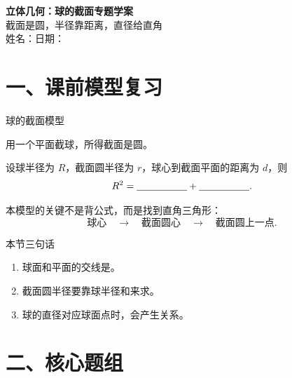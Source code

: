 \documentclass[11pt,a4paper]{ctexart}
\begin{document}
\begin{center}
  {\Large\bfseries 立体几何：球的截面专题学案}\\[0.3em]
  {\large 截面是圆，半径靠距离，直径给直角}\\[0.3em]
  姓名：\blank{2.8cm}\quad 日期：\blank{2.8cm}
\end{center}

\section*{一、课前模型复习}

\begin{taskbox}{球的截面模型}
\begin{minipage}[t]{0.62\textwidth}
用一个平面截球，所得截面是圆。

设球半径为 $R$，截面圆半径为 $r$，球心到截面平面的距离为 $d$，则
\[
  R^2=\blank{1.8cm}+\blank{1.8cm}.
\]

本模型的关键不是背公式，而是找到直角三角形：
\[
  \text{球心}\quad \longrightarrow \quad \text{截面圆心}\quad \longrightarrow \quad \text{截面圆上一点}.
\]
\end{minipage}
\hfill
\begin{minipage}[t]{0.32\textwidth}
  \centering
  \qSolidSphereSectionRatioFigure[0.9]
\end{minipage}
\end{taskbox}

\begin{taskbox}{本节三句话}
\begin{enumerate}[label=\arabic*. , leftmargin=2em, itemsep=0.25em]
  \item 球面和平面的交线是\blank{2cm}。
  \item 截面圆半径要靠球半径和\blank{3cm}来求。
  \item 球的直径对应球面点时，会产生\blank{2cm}关系。
\end{enumerate}
\end{taskbox}

\section*{二、核心题组}

\freequestionheader
\qSolidSphereSectionRatioStem
\begin{center}
  \qSolidSphereSectionRatioFigure
\end{center}

\newpage

\freequestionheader
\qSolidPrismSphereSectionStem
\begin{center}
  \qSolidPrismSphereSectionFigure[1.1]
\end{center}
\end{document}
